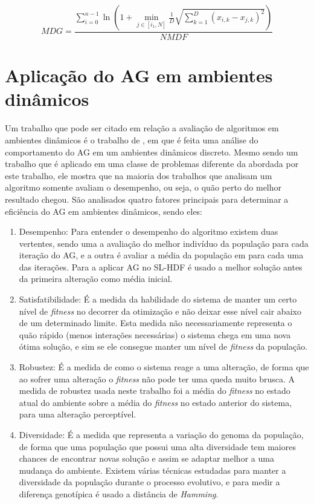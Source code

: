 \begin{equation}
\label{eq:genotypic}
MDG = \frac{\sum_{i=0}^{n-1} \ln \left(1 + \min_{j \in [i_1,N]} \frac{1}{D} \sqrt{ \sum\limits_{k=1}^{D} (x_{i,k} - x_{j,k})^2}\right)}{NMDF}
\end{equation}

\section{Aplicação do AG em ambientes dinâmicos}
\label{sec:ag_behaviour}

Um trabalho que pode ser citado em relação a avaliação de algoritmos em ambientes dinâmicos é o trabalho de \cite{rand2005measurements}, em que é feita uma análise do comportamento do AG em um ambientes dinâmicos discreto. Mesmo sendo um trabalho que é aplicado em uma classe de problemas diferente da abordada por este trabalho, ele mostra que na maioria dos trabalhos que analisam um algoritmo somente avaliam o desempenho, ou seja, o quão perto do melhor resultado chegou. São analisados quatro fatores principais para determinar a eficiência do AG em ambientes dinâmicos, sendo eles:

\begin{enumerate}
	\item Desempenho: Para entender o desempenho do algoritmo existem duas vertentes, sendo uma a avaliação do melhor indivíduo da população para cada iteração do AG, e a outra é avaliar a média da população em para cada uma das iterações. Para a aplicar AG no SL-HDF é usado a melhor solução antes da primeira alteração como média inicial.

	\item Satisfatibilidade: É a medida da habilidade do sistema de manter um certo nível de \textit{fitness} no decorrer da otimização e não deixar esse nível cair abaixo de um determinado limite. Esta medida não necessariamente representa o quão rápido (menos interações necessárias) o sistema chega em uma nova ótima solução, e sim se ele consegue manter um nível de \textit{fitness} da população.

	\item Robustez: É a medida de como o sistema reage a uma alteração, de forma que ao sofrer uma alteração o \textit{fitness} não pode ter uma queda muito brusca. A medida de robustez usada neste trabalho foi a média do \textit{fitness} no estado atual do ambiente sobre a média do \textit{fitness} no estado anterior do sistema, para uma alteração perceptível.

	\item Diversidade: É a medida que representa a variação do genoma da população, de forma que uma população que possui uma alta diversidade tem maiores chances de encontrar novas solução e assim se adaptar melhor a uma mudança do ambiente. Existem várias técnicas estudadas para manter a diversidade da população durante o processo evolutivo, e para medir a diferença genotípica é usado a distância de \textit{Hamming}.
\end{enumerate}

